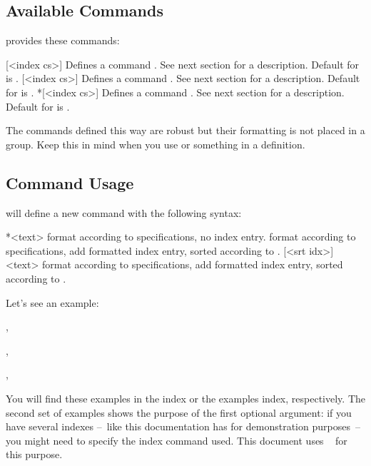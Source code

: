 \documentclass{cnpkgdoc}
\begin{document}
\subsection{Available Commands}
\idxcmds provides these commands:
\begin{beschreibung}
 [<index cs>]{}\newline
   Defines a command . See next section for a description. Default for
    is .
 [<index cs>]{}\newline
   Defines a command . See next section for a description. Default for
    is .
 *[<index cs>]{}\newline
   Defines a command . See next section for a description. Default for
    is .
\end{beschreibung}

The commands defined this way are robust but their formatting is not placed in
a group. Keep this in mind when you use  or something in a definition.

\subsection{Command Usage}
 will define a new command with the following syntax:
\begin{beschreibung}
 *{<text>}\newline
   format  according to specifications, no index entry.
 \newline
   format  according to specifications, add formatted index entry,
   sorted according to .
 [<srt idx>]{<text>}\newline
   format  according to specifications, add formatted index entry,
   sorted according to .
\end{beschreibung}

Let's see an example:
\begin{beispiel}
 , 
 
 , 

 , 
\end{beispiel}
You will find these examples in the index or the examples index, respectively.
The second set of examples shows the purpose of the first optional argument: if
you have several indexes --~like this documentation has for demonstration
purposes~-- you might need to specify the index command used. This document uses
~\cite{pkg:imakeidx} for this purpose.
\end{document}

